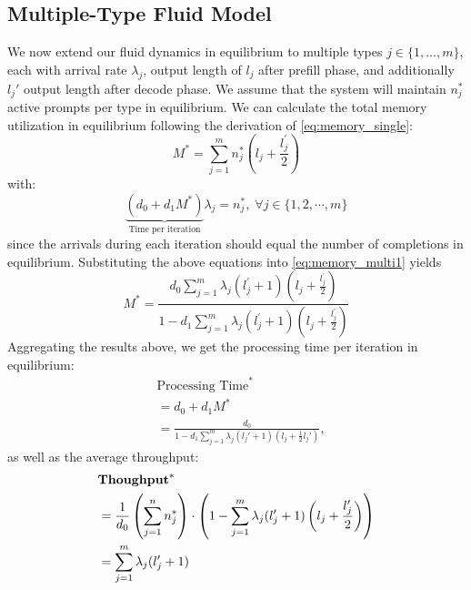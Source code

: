\subsection{Multiple-Type Fluid Model}
We now extend our fluid dynamics in equilibrium to multiple types \(j \in \{1, \dots, m\}\), each with arrival rate \(\lambda_j\), output length of \(l_j\) after prefill phase, and additionally \(l_j'\) output length after decode phase. We assume that the system will maintain \(n_j^*\) active prompts per type in equilibrium. We can calculate the total memory utilization in equilibrium following the derivation of \eqref{eq:memory_single}:
\begin{equation}
\label{eq:memory_multi1}
    M^* = \sum_{j=1}^m n_j^*\left(l_j + \frac{l_j^\prime}{2}\right)
\end{equation}
with:
$$ \underset{\text{Time per iteration}}{\underbrace{(d_0+d_1M^*)}}\lambda_j = n_j^*, \;\forall j \in \{1,2,\cdots,m\}$$
since the arrivals during each iteration should equal the number of completions in equilibrium. Substituting the above equations into \eqref{eq:memory_multi1} yields
\begin{equation}
\label{eq:memory_multi2}
M^* = \frac{d_0\sum_{j=1}^m \lambda_j (l_j^{\prime}+1)\left(l_j + \frac{l_j^{\prime}}{2} \right)}{1-d_1\sum_{j=1}^m \lambda_j (l_j^{\prime}+1)\left(l_j + \frac{l_j^{\prime}}{2} \right) } 
\end{equation}
Aggregating the results above, we get the processing time per iteration in equilibrium:
\begin{equation}    \label{eq:time_fluid}
    \begin{aligned}
            &\text{Processing Time}^* \\&= d_0 + d_1 M^*  \\
                  &= \frac{d_0}{1 - d_1 \sum_{j=1}^m \lambda_j (l_j' + 1)(l_j + \tfrac{1}{2}l_j')},
    \end{aligned}
\end{equation}
as well as the average throughput:
\begin{equation}
    \label{throughput_fluid_multiple}
    \begin{aligned}
        &\textbf{Thoughput}^* 
        \\&= \frac{1}{d_0}\left(\sum_{j=1}^n n_j^*\right) \cdot \left(1 - \sum_{j=1}^m \lambda_j (l_j^{\prime}+1)\left(l_j + \frac{l_j^{\prime}}{2} \right)\right) \\
        &= \sum_{j=1}^m \lambda_j(l_j^{\prime}+1)
    \end{aligned}
\end{equation}
